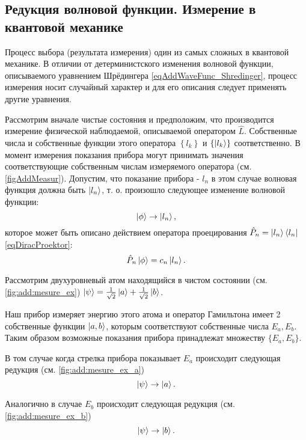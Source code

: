\subsection{Редукция волновой функции. Измерение в квантовой механике}
\label{sec:add:reduction}

Процесс выбора (результата измерения) один из самых сложных в
квантовой механике. В отличии от детерминистского изменения волновой
функции, описываемого уравнением Шрёдингера
\eqref{eqAddWaveFunc_Shredinger}, процесс измерения носит случайный
характер и для его описания следует применять другие уравнения. 



Рассмотрим вначале чистые состояния и предположим, что производится
измерение физической наблюдаемой, 
описываемой оператором $\hat{L}$. Собственные числа и собственные
функции этого оператора $\left\{ l_k \right\}$ и 
$\left\{ \ket{l_k} \right\}$ соответственно. В момент
измерения показания прибора могут принимать значения соответствующие
собственным числам измеряемого оператора
(см. \autoref{figAddMeasur}). Допустим, что показание 
прибора - $l_n$ в этом случае волновая функция должна быть 
$\ket{l_n}$, т. о. произошло следующее
изменение волновой функции:
\[
\left| \phi \right> \rightarrow \ket{l_n},
\] 
которое может быть описано действием оператора проецирования 
$\hat{P}_n = \ket{l_n} \bra{l_n}$ \eqref{eqDiracProektor}:
\[
\hat{P}_n \left| \phi \right> = c_n\ket{l_n}.
\]

\begin{example}
Рассмотрим двухуровневый атом находящийся в чистом состоянии
(см. \autoref{fig:add:mesure_ex}) 
\(
\left|\psi\right> = \frac{1}{\sqrt{2}}\ket{a}
+ \frac{1}{\sqrt{2}}\ket{b}
\).



Наш прибор измеряет энергию этого атома и  оператор
Гамильтона имеет 2 собственные функции $\ket{a,b}$, которым
соответствуют собственные числа $E_a, E_b$. Таким образом возможные
показания прибора принадлежат множеству $\{E_a, E_b\}$. 



В том случае когда стрелка прибора показывает $E_a$ происходит
следующая редукция  (см. \autoref{fig:add:mesure_ex_a})
\[
\left|\psi\right> \to \ket{a}.
\]



Аналогично в случае $E_b$ происходит
следующая редукция  (см. \autoref{fig:add:mesure_ex_b})
\[
\left|\psi\right> \to \ket{b}.
\]
\end{example}

